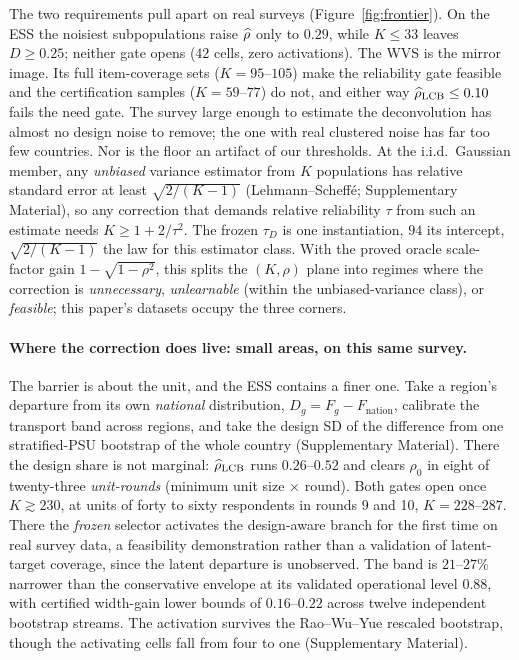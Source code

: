 The two requirements pull apart on real surveys (Figure~\ref{fig:frontier}).
On the ESS the noisiest subpopulations raise $\widehat{\rho}$ only to $0.29$, while
$K\le33$ leaves $D\ge0.25$; neither gate opens ($42$ cells, zero
activations). The WVS is the mirror image. Its full item-coverage sets
($K=95$--$105$) make the reliability gate feasible and the certification
samples ($K=59$--$77$) do not, and either way $\widehat{\rho}_{\mathrm{LCB}}\le0.10$
fails the need gate. The survey large enough to estimate the deconvolution
has almost no design noise to remove; the one with real clustered noise has
far too few countries. Nor is the floor an artifact of our
thresholds. At the i.i.d.\ Gaussian member, any \emph{unbiased} variance
estimator from $K$ populations has relative standard error at least
$\sqrt{2/(K-1)}$ (Lehmann--Scheff\'e; Supplementary Material), so any
correction that demands relative reliability $\tau$ from such an estimate
needs $K\ge1+2/\tau^2$. The frozen $\tau_D$ is one instantiation, $94$
its intercept, $\sqrt{2/(K-1)}$ the law for this estimator class. With the
proved oracle scale-factor gain $1-\sqrt{1-\rho^2}$, this splits the
$(K,\rho)$ plane into regimes where the correction is
\emph{unnecessary}, \emph{unlearnable} (within the unbiased-variance class),
or \emph{feasible}; this paper's datasets occupy the three corners.

\paragraph{Where the correction does live: small areas, on this same survey.}
The barrier is about the unit, and the ESS contains a finer one. Take a
region's departure from its own \emph{national} distribution,
$D_g=F_g-F_{\text{nation}}$, calibrate the transport band across regions,
and take the design SD of the difference from one stratified-PSU bootstrap
of the whole country (Supplementary Material). There the design share is not
marginal: $\widehat{\rho}_{\text{LCB}}$ runs $0.26$--$0.52$ and clears $\rho_0$ in
eight of twenty-three \emph{unit-rounds} (minimum unit size $\times$ round).
Both gates open once $K\gtrsim230$, at units of forty to sixty respondents
in rounds 9 and 10, $K=228$--$287$. There the \emph{frozen} selector
activates the design-aware branch for the first time on real survey data, a
feasibility demonstration rather than a validation of latent-target
coverage, since the latent departure is unobserved. The band
is $21$--$27\%$ narrower than the conservative envelope at its validated
operational level $0.88$, with certified width-gain lower bounds of
$0.16$--$0.22$ across twelve independent bootstrap streams. The activation
survives the Rao--Wu--Yue rescaled bootstrap, though the activating cells
fall from four to one (Supplementary Material).

